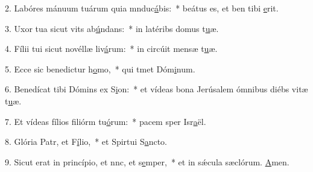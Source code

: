 2. Labóres mánuum tuárum quia mnduc\uline{á}bis:~* beátus es, et ben tibi \uline{e}rit.\par 
3. Uxor tua sicut vits ab\uline{ú}ndans:~* in latéribs domus t\uline{u}æ.\par 
4. Fílii tui sicut novéllæ liv\uline{á}rum:~* in circúit mensæ t\uline{u}æ.\par 
5. Ecce sic benedictur h\uline{o}mo,~* qui tmet Dóm\uline{i}num.\par 
6. Benedícat tibi Dómins ex S\uline{i}on:~* et vídeas bona Jerúsalem ómnibus diébs vitæ t\uline{u}æ.\par 
7. Et vídeas fílios filiórm tu\uline{ó}rum:~* pacem sper Isr\uline{a}ël.\par 
8. Glória Patr, et F\uline{í}lio,~* et Spirtui S\uline{a}ncto.\par 
9. Sicut erat in princípio, et nnc, et s\uline{e}mper,~* et in sǽcula sæclórum. \uline{A}men.\par 
